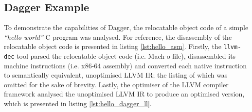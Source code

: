 
\subsection{Dagger Example}
\label{app:dagger_example}

To demonstrate the capabilities of Dagger, the relocatable object code of a simple \textit{``hello world''} C program was analysed. For reference, the disassembly of the relocatable object code is presented in listing \ref{lst:hello_asm}. Firstly, the \texttt{llvm-dec} tool parsed the relocatable object code (i.e. Mach-o file), disassembled its machine instructions (i.e. x86-64 assembly) and converted each native instruction to semantically equivalent, unoptimised LLVM IR; the listing of which was omitted for the sake of brevity. Lastly, the optimiser of the LLVM compiler framework analysed the unoptimised LLVM IR to produce an optimised version, which is presented in listing \ref{lst:hello_dagger_ll}.




